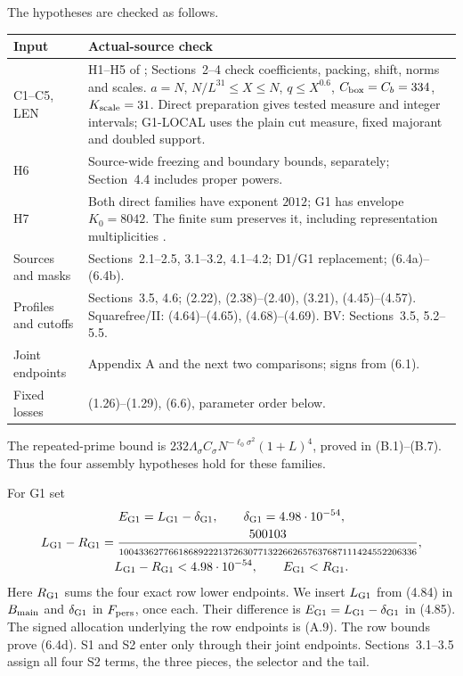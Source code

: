 The hypotheses are checked as follows.
\begin{longtable}{@{}p{}p{}@{}}
\toprule
Input & Actual-source check \\\midrule
C1--C5, LEN & H1--H5 of \cite[Theorem~3.2]{Z1}; Sections~2--4 check coefficients, packing, shift, norms and scales. $a=N$, $N/L^{31}\le X\le N$, $q\le X^{0.6}$, $C_{\rm box}=C_b=334$, $K_{\rm scale}=31$. Direct preparation gives tested measure and integer intervals; G1-LOCAL uses the plain cut measure, fixed majorant and doubled support. \\
H6 & Source-wide freezing and boundary bounds, separately; Section~4.4 includes proper powers. \\
H7 & Both direct families have exponent $2012$; G1 has envelope $K_0=8042$. The finite sum preserves it, including representation multiplicities \cite[(3.91)]{Z1}. \\
Sources and masks & Sections~2.1--2.5, 3.1--3.2, 4.1--4.2; D1/G1 replacement; (6.4a)--(6.4b). \\
Profiles and cutoffs & Sections~3.5, 4.6; (2.22), (2.38)--(2.40), (3.21), (4.45)--(4.57). Squarefree/II: (4.64)--(4.65), (4.68)--(4.69). BV: Sections~3.5, 5.2--5.5. \\
Joint endpoints & Appendix A and the next two comparisons; signs from (6.1). \\
Fixed losses & (1.26)--(1.29), (6.6), parameter order below. \\
\bottomrule
\end{longtable}
The repeated-prime bound is
$232\Lambda_\sigma C_\sigma N^{-\ell_0\sigma^2}(1+L)^4$,
proved in (B.1)--(B.7).
Thus the four assembly hypotheses hold for these families.

For G1 set
\[
\begin{gathered}
E_{\rm G1}=L_{\rm G1}-\delta_{\rm G1},\qquad
\delta_{\rm G1}=4.98\cdot10^{-54},\\
L_{\rm G1}-R_{\rm G1}
=\frac{500103}{\scriptstyle100433627766186892221372630771322662657637687111424552206336},\\
L_{\rm G1}-R_{\rm G1}<4.98\cdot10^{-54},\qquad E_{\rm G1}<R_{\rm G1}.
\end{gathered}
\]
Here $R_{\rm G1}$ sums the four exact row lower endpoints.
We insert $L_{\rm G1}$ from (4.84) in $B_{\rm main}$ and
$\delta_{\rm G1}$ in $F_{\rm pers}$, once each.
Their difference is $E_{\rm G1}=L_{\rm G1}-\delta_{\rm G1}$ in (4.85).
The signed allocation underlying the row endpoints is (A.9).
The row bounds prove (6.4d).
S1 and S2 enter only through their joint endpoints.
Sections~3.1--3.5 assign all four S2 terms, the three pieces, the selector and the tail.

